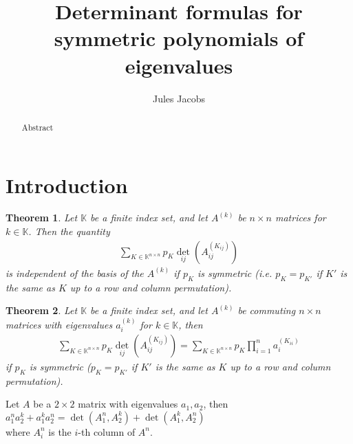 \documentclass[a4paper, 11pt]{article}
\title{Determinant formulas for symmetric polynomials of eigenvalues}
\author{Jules Jacobs}
\newtheorem{theorem}{Theorem}[section]
\theoremstyle{definition}
\begin{document}
\maketitle

\begin{abstract}
 Abstract
\end{abstract}

\section{Introduction}

\begin{theorem}
  Let $\mathbb{K}$ be a finite index set, and let $A^{(k)}$ be $n\times n$ matrices for $k \in \mathbb{K}$.
  Then the quantity
  \begin{align}
    \sum_{K\in \mathbb{K}^{n\times n}} p_K \det_{ij}(A^{(K_{ij})}_{ij})
  \end{align}
  is independent of the basis of the $A^{(k)}$ if $p_K$ is symmetric (i.e. $p_K = p_{K'}$ if $K'$ is the same as $K$ up to a row and column permutation).
\end{theorem}

\begin{theorem}
  Let $\mathbb{K}$ be a finite index set, and let $A^{(k)}$ be commuting $n\times n$ matrices with eigenvalues $a^{(k)}_i$ for $k \in \mathbb{K}$,
  then
  \begin{align}
    \sum_{K\in \mathbb{K}^{n\times n}} p_K \det_{ij}\left(A^{(K_{ij})}_{ij}\right) =
    \sum_{K\in \mathbb{K}^{n\times n}} p_K \prod_{i=1}^{n} a^{(K_{ii})}_{i}
  \end{align}
  if $p_K$ is symmetric ($p_K = p_{K'}$ if $K'$ is the same as $K$ up to a row and column permutation).
\end{theorem}

\noindent Let $A$ be a $2 \times 2$ matrix with eigenvalues $a_1,a_2$, then
\medskip \\
\indent \(
  a_1^n a_2^k + a_1^k a_2^n = \det(A^n_1, A^k_2) +\det(A^k_1, A^n_2)
\)
\medskip \\ \medskip
where $A^n_i$ is the $i$-th column of $A^n$.
\end{document}
